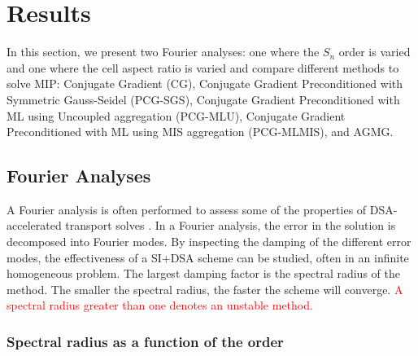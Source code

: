 \section{Results} \label{sec_res}

In this section, we present two Fourier analyses: one where the $S_n$ order is
varied and one where the cell aspect ratio is varied and compare different
methods to solve MIP: Conjugate Gradient (CG), Conjugate Gradient
Preconditioned with Symmetric Gauss-Seidel (PCG-SGS), Conjugate Gradient
Preconditioned with ML using Uncoupled aggregation (PCG-MLU),
Conjugate Gradient Preconditioned with ML using MIS aggregation (PCG-MLMIS),
and AGMG. 

\subsection{Fourier Analyses}

A Fourier analysis is often performed to assess some of the properties of 
DSA-accelerated transport solves \cite{larsen_dsa,consistent_p1}. In a Fourier analysis,
the error in the solution is decomposed into Fourier modes. By inspecting the 
damping of the different error modes, the effectiveness of a SI+DSA scheme can 
be studied, often in an infinite homogeneous problem. The largest damping
factor is the spectral radius of the method. The smaller the spectral radius,
the faster the scheme will converge. \textcolor{red}{A spectral radius greater than one denotes
an unstable method.} 

\subsubsection{Spectral radius as a function of the \sn order}

